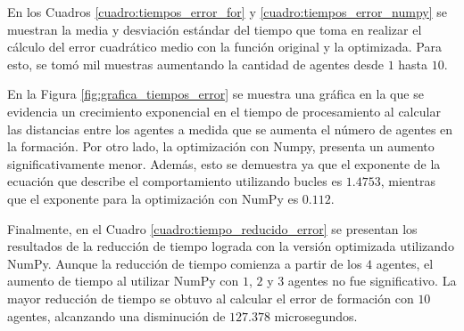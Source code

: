 En los Cuadros \ref{cuadro:tiempos_error_for} y \ref{cuadro:tiempos_error_numpy} se muestran la media y desviación estándar del tiempo que toma en realizar el cálculo del error cuadrático medio con la función original y la optimizada. Para esto, se tomó mil muestras aumentando la cantidad de agentes desde $1$ hasta $10$. 

En la Figura \ref{fig:grafica_tiempos_error} se muestra una gráfica en la que se evidencia un crecimiento exponencial en el tiempo de procesamiento al calcular las distancias entre los agentes a medida que se aumenta el número de agentes en la formación. Por otro lado, la optimización con Numpy, presenta un aumento significativamente menor. Además, esto se demuestra ya que el exponente de la ecuación que describe el comportamiento utilizando bucles es $1.4753$, mientras que el exponente para la optimización con NumPy es $0.112$.

Finalmente, en el Cuadro \ref{cuadro:tiempo_reducido_error} se presentan los resultados de la reducción de tiempo lograda con la versión optimizada utilizando NumPy. Aunque la reducción de tiempo comienza a partir de los $4$ agentes, el aumento de tiempo al utilizar NumPy con $1$, $2$ y $3$ agentes no fue significativo. La mayor reducción de tiempo se obtuvo al calcular el error de formación con $10$ agentes, alcanzando una disminución de $127.378$ microsegundos.

